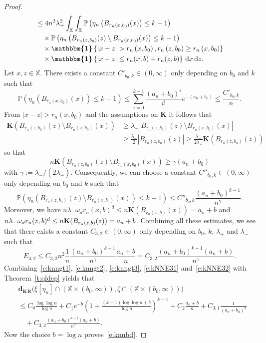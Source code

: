 \documentclass[AHL,Unicode,longabstracts]{cedram}
\newcommand*\bK{\mathbf{K}}
\newcommand*\dkr{\mathbf{d_{KR}}}
\renewcommand*\P{\mathbb{P}}
\newcommand*\X{\mathbb{X}}
\newcommand*\md{\mathrm{d}}
\newcommand{\ind}{\boldsymbol{\mathbbm{1}}}
\newcommand{\set}[1]{\left\{#1\right\}}
\newcommand{\param}[1]{\left(#1\right)}
\newcommand{\prob}[1]{\P\left(#1\right)}
\begin{document}
\begin{proof}
\begin{align*}
& \leq {4} n^2 \lambda_+^2 \int_{\X}\int_{\X} \prob{\eta_n \left(B_{r_n\left(x,b_0\right)}(x)\right) \leq k-1} \\
&\quad\times\prob{\eta_n\left(B_{r_n\left(z,b_0\right)}(z)\setminus B_{r_n\left(x,b_0\right)}(x)\right) \leq k-1} \\
&\quad\times \ind\set{|x-z|> r_n\left(x,b_0\right), r_n\left(z,b_0\right)\geq r_n\left(x,b_0\right)}\\
&\quad\times\ind\set{|x-z| \leq r_n(x,b) + r_n(z,b)} \, \md x \, \md z.
\end{align*}
Let $x,z\in\X$. There exists a constant $C'_{b_0,k}\in(0,\infty)$ only depending on $b_0$ and $k$ such that
\[
\prob{\eta_n \left(B_{r_n\left(x,b_0\right)}(x)\right) \leq k-1} \leq \sum_{i=0}^{k-1} \frac{\left(a_n+b_0\right)^i}{i!} e^{-\left(a_n+b_0\right)} \leq \frac{C'_{b_0,k}}{n}.
\]
From $|x-z|> r_n(x,b_0)$ and the assumptions on $\bK$ it follows that
\begin{align*}
\bK\left(B_{r_n\left(z,b_0\right)}(z)\setminus B_{r_n\left(x,b_0\right)}(x)\right) &\geq \lambda_{-} \left|B_{r_n\left(z,b_0\right)}(z)\setminus B_{r_n(x,b_0)}(x)\right| \\
&\geq \frac{\lambda_{-}}{2} \left|B_{r_n\left(z,b_0\right)}(z)\right| \geq \frac{\lambda_{-}}{2\lambda_{+}} \bK\left(B_{r_n\left(z,b_0\right)}(z)\right)
\end{align*}
so that
\[
n \bK\left(B_{r_n\left(z,b_0\right)}(z)\setminus B_{r_n\left(x,b_0\right)}(x)\right) \geq \gamma \left(a_n+b_0\right)
\]
with $\gamma:=\lambda_-/(2\lambda_+)$. Consequently, we can choose a constant $C''_{b_0,k}\in(0,\infty)$ only depending on $b_0$ and $k$ such that
\[
\prob{\eta_n\left(B_{r_n\left(z,b_0\right)}(z)\setminus B_{r_n\left(x,b_0\right)}(x)\right) \leq k-1} \leq C''_{b_0,k} \frac{\left(a_n+b_0\right)^{k-1}}{n^{\gamma}}.
\]
Moreover, we have $n \lambda_{-} \omega_d r_n(x,b)^d\leq n\bK(B_{r_n(x,b)}(x)) =a_n +b$ and $n \lambda_{-} \omega_d r_n(z,b)^d\linebreak\leq n\bK(B_{r_n(z,b)}(z)) =a_n +b$. Combining all these estimates, we see that there exists a constant $C_{3,2}\in(0,\infty)$ only depending on $b_0$, $k$, $\lambda_+$ and $\lambda_-$ such that
\begin{equation}\label{e:kNNE32}
E_{3,2} \leq C_{3,2} n^2 \frac{1}{n} \frac{\left(a_n+b_0\right)^{k-1}}{n^{\gamma}} \frac{a_n+b}{n} = C_{3,2} \frac{\left(a_n+b_0\right)^{k-1}\left(a_n+b\right)}{n^{\gamma}}.
\end{equation}
Combining~\eqref{e:knngt1}, \eqref{e:knngt2}, \eqref{e:knngt3}, \eqref{e:kNNE31} and~\eqref{e:kNNE32} with Theorem~\ref{t:qldep} yields that
\begin{align*}
& \dkr\big(\xi\left[\eta_n\right] \cap \left(\X \times \left(b_0,\infty\right)\right),\zeta \cap \left(\X \times \left(b_0,\infty\right)\right)\big) \\
& \leq C_0\frac{\log \log n}{\log n} + C_1 e^{-b}\param{1 + \frac{(k-1)\log \log n +b}{\log n}}^{k-1} + C_2 \frac{a_n + b}{n} + C_{3,1}\frac{1}{(a_n+b_0)^d} \\
& \quad + C_{3,2}\frac{(a_n+b_0)^{k-1}(a_n+b)}{n^{\gamma}}.
\end{align*}
Now the choice $b=\log n$ proves~\eqref{e:knnbd}.


\end{proof}
\end{document}
